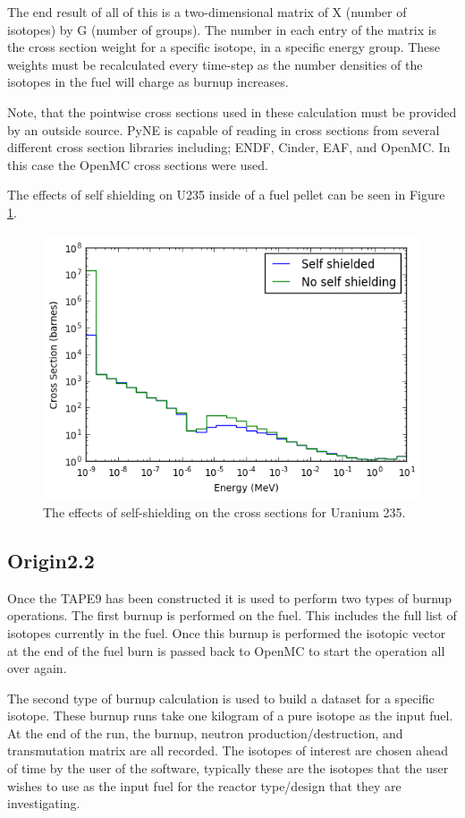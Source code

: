 \documentclass{article}
\begin{document}
The end result of all of this is a two-dimensional matrix of X (number of isotopes) by G (number of groups). The number in each entry of the matrix is the cross section weight for a specific isotope, in a specific energy group. These weights must be recalculated every time-step as the number densities of the isotopes in the fuel will charge as burnup increases.

Note, that the pointwise cross sections used in these calculation must be provided by an outside source. PyNE is capable of reading in cross sections from several different cross section libraries including; ENDF, Cinder, EAF, and OpenMC. In this case the OpenMC cross sections were used.

The effects of self shielding on U235 inside of a fuel pellet can be seen in Figure \ref{fig:index}.
\begin{figure}[h]
  \center
  \includegraphics[scale=0.8]{index.png}
  \caption{The effects of self-shielding on the cross sections for Uranium 235.}
  \label{fig:index}
\end{figure}

\subsection{Origin2.2}
Once the TAPE9 has been constructed it is used to perform two types of burnup operations. The first burnup is performed on the fuel. This includes the full list of isotopes currently in the fuel. Once this burnup is performed the isotopic vector at the end of the fuel burn is passed back to OpenMC to start the operation all over again.

The second type of burnup calculation is used to build a dataset for a specific isotope. These burnup runs take one kilogram of a pure isotope as the input fuel. At the end of the run, the burnup, neutron production/destruction, and transmutation matrix are all recorded. The isotopes of interest are chosen ahead of time by the user of the software, typically these are the isotopes that the user wishes to use as the input fuel for the reactor type/design that they are investigating.
\end{document}

